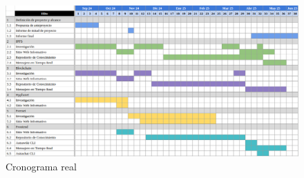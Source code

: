 \begin{figure}[H]
    \centering
    \includegraphics[width=1\linewidth]{img/cronograma-real.png}
    \caption{Cronograma real}
    \label{fig:cronograma-real}
\end{figure}



    
    
